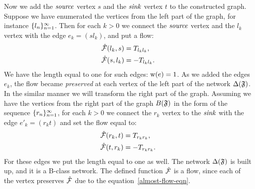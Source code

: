 \documentclass[12pt]{article}
\begin{document}
    Now we add the $\mathit{source}$ vertex $s$ and the $\mathit{sink}$ vertex $t$ to the constructed graph.
    Suppose we have enumerated the vertices from the left part of the graph, for instance $\{{l}_n\}_{n=1}^\infty$.
    Then for each $k > 0$ we connect the $\mathit{source}$ vertex and the $l_k$ vertex with
      the edge $e_k = (s l_k)$, and put a flow:
    \begin{align*}
      &\mathcal{\hat{F}}(l_k, s) = T_{l_k l_k},\\
      &\mathcal{\hat{F}}(s, l_k) = -T_{l_k l_k}.
    \end{align*}
    We have the length equal to one for such edges: $\mathrm{w}(e) = 1$.
    As we added the edges ${e_k}$, the flow became \emph{preserved} at each vertex of the left part of the network $\Delta(\mathfrak{F})$.
    In the similar manner we will transform the right part of the graph.
    Assuming we have the vertices from the right part of the graph $B(\mathfrak{F})$ in the form of the sequence $\{{r}_n\}_{n=1}^\infty$,
      for each $k > 0$ we connect the $r_k$ vertex to the $\mathit{sink}$ with the edge $e'_k=(r_k t)$
      and set the flow equal to:
    \begin{align*}
      &\mathcal{\hat{F}}(r_k, t) = T_{r_k r_k},\\
      &\mathcal{\hat{F}}(t, r_k) = -T_{r_k r_k}.
    \end{align*}
    For these edges we put the length equal to one as well.
    The network $\Delta(\mathfrak{F})$ is built up, and it is a B-class network.
    The defined function $\mathcal{\hat{F}}$ is a flow, since each of the vertex preserves
      $\mathcal{\hat{F}}$ due to the equation~\eqref{almost-flow-eqn}.
\end{document}
